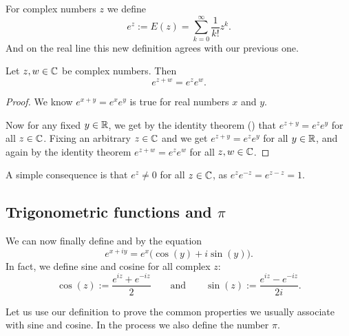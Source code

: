 For complex numbers $z$ we define
\begin{equation*}
e^z := E(z) = 
\sum_{k=0}^\infty \frac{1}{k!} z^k .
\end{equation*}
And on the real line this new definition agrees with our previous one.

\begin{prop}
Let $z,w \in {\mathbb{C}}$ be complex numbers.  Then
\begin{equation*}
e^{z+w} = e^z e^w.
\end{equation*}
\end{prop}

\begin{proof}
We know
$e^{x+y} = e^x e^y$ is true for
real numbers $x$ and $y$.

Now for any fixed $y \in {\mathbb{R}}$, we get by the
identity theorem () that
$e^{z+y} = e^ze^y$ for all $z \in {\mathbb{C}}$.  Fixing an arbitrary $z \in {\mathbb{C}}$
and we get
$e^{z+y} = e^ze^y$ for all $y \in {\mathbb{R}}$, and again by the identity theorem 
$e^{z+w} = e^z e^w$
for all $z,w \in {\mathbb{C}}$.
\end{proof}

A simple consequence is that $e^z\not=0$ for all $z \in {\mathbb{C}}$,
as $e^z e^{-z} = e^{z-z} = 1$.

\subsection{Trigonometric functions and $\pi$}

We can now finally define \emph{} and \emph{}
by the equation
\begin{equation*}
e^{x+iy} = e^x \bigl( \cos(y) + i \sin(y) \bigr) .
\end{equation*}
In fact, we define sine and cosine for all complex $z$:
\begin{equation*}
\cos(z) := \frac{e^{iz} + e^{-iz}}{2}
\qquad\text{and}\qquad
\sin(z) := \frac{e^{iz} - e^{-iz}}{2i} .
\end{equation*}

Let us use our definition to prove the common properties we usually
associate with sine and cosine.  In the process we also define the
number $\pi$.

